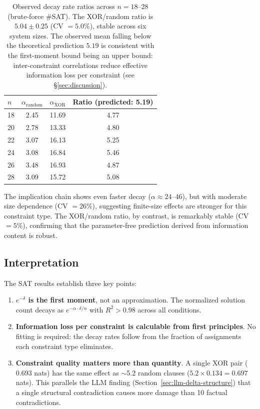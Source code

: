\documentclass[11pt,a4paper]{article}
\begin{document}
\begin{table}[htbp]
\centering
\begin{tabular}{lccc}
\toprule
$n$ & $\alpha_{\text{random}}$ & $\alpha_{\text{XOR}}$ & Ratio (predicted: 5.19) \\
\midrule
18 & 2.45 & 11.69 & 4.77 \\
20 & 2.78 & 13.33 & 4.80 \\
22 & 3.07 & 16.13 & 5.25 \\
24 & 3.08 & 16.84 & 5.46 \\
26 & 3.48 & 16.93 & 4.87 \\
28 & 3.09 & 15.72 & 5.08 \\
\bottomrule
\end{tabular}
\caption{Observed decay rate ratios across $n = 18$--$28$ (brute-force \#SAT). The XOR/random ratio is $5.04 \pm 0.25$ (CV $= 5.0\%$), stable across six system sizes. The observed mean falling below the theoretical prediction $5.19$ is consistent with the first-moment bound being an upper bound: inter-constraint correlations reduce effective information loss per constraint (see \S\ref{sec:discussion}).}
\label{tab:ratio}
\end{table}

The implication chain shows even faster decay ($\alpha \approx 24$--46), but with moderate size dependence (CV $= 26\%$), suggesting finite-size effects are stronger for this constraint type. The XOR/random ratio, by contrast, is remarkably stable (CV $= 5\%$), confirming that the parameter-free prediction derived from information content is robust.

\subsection{Interpretation}

The SAT results establish three key points:

\begin{enumerate}
    \item \textbf{$e^{-\delta}$ is the first moment}, not an approximation. The normalized solution count decays as $e^{-\alpha \cdot \delta/n}$ with $R^2 > 0.98$ across all conditions.
    \item \textbf{Information loss per constraint is calculable from first principles}. No fitting is required: the decay rates follow from the fraction of assignments each constraint type eliminates.
    \item \textbf{Constraint quality matters more than quantity}. A single XOR pair ($0.693$ nats) has the same effect as $\sim$5.2 random clauses ($5.2 \times 0.134 = 0.697$ nats). This parallels the LLM finding (Section~\ref{sec:llm-delta-structure}) that a single structural contradiction causes more damage than 10 factual contradictions.
\end{enumerate}
\end{document}
